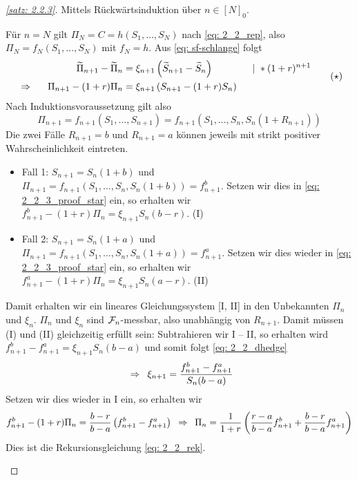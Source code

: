 \begin{proof}[\cref{satz: 2.2.3}]
	Mittels Rückwärtsinduktion über $n \in [N]_0$.
	\begin{induction}
		\ianfang Für $n = N$ gilt $\Pi_N = C = h(S_1, \dots, S_N)$ nach \eqref{eq: 2_2_rep}, also $\Pi_N = f_N(S_1, \dots, S_N)$ mit $f_N = h$.
		\ischritt Aus \eqref{eq: sf-schlange} folgt
		\begin{equation*}
			\begin{aligned}
				\widetilde{\Pi}_{n+1} - \widetilde{\Pi}_n &= \xi_{n+1} \left( \widetilde{S}_{n+1} - \widetilde{S}_n \right) \qquad\qquad | \ * (1+r)^{n+1} \\
				\enskip \Rightarrow \enskip  \quad \Pi_{n+1} - (1+r) \Pi_n &= \xi_{n+1} \left( S_{n+1} - (1+r) S_n \right)
			\end{aligned} \tag{$\star$} \label{eq: 2_2_3_proof_star}
		\end{equation*}
		Nach Induktionsvoraussetzung gilt also
		\begin{equation*}
			\Pi_{n+1} = f_{n+1} (S_1, \dots, S_{n+1}) = f_{n+1} (S_1, \dots, S_n, S_n (1+R_{n+1}))
		\end{equation*}
		Die zwei Fälle $R_{n+1} = b$ und $R_{n+1} = a$ können jeweils mit strikt positiver Wahrscheinlichkeit eintreten.
		\begin{itemize}
			\item Fall 1: $S_{n+1} = S_n (1+b)$ und $\Pi_{n+1} = f_{n+1}(S_1, \dots, S_n, S_n(1+b)) = f_{n+1}^b$. Setzen wir dies in \eqref{eq: 2_2_3_proof_star} ein, so erhalten wir $f_{n+1}^b - (1+r) \Pi_n = \xi_{n+1} S_n (b-r)$. \hfill (I)
			\item Fall 2: $S_{n+1} = S_n (1+a)$ und $\Pi_{n+1} = f_{n+1}(S_1, \dots, S_n, S_n(1+a)) = f_{n+1}^a$. Setzen wir dies wieder in \eqref{eq: 2_2_3_proof_star} ein, so erhalten wir $f_{n+1}^a - (1+r) \Pi_n = \xi_{n+1} S_n (a-r)$. \hfill (II)
		\end{itemize}
	Damit erhalten wir ein lineares Gleichungssystem [I, II] in den Unbekannten $\Pi_n$ und $\xi_n$. 
	$\Pi_n$ und $\xi_n$ sind $\mathcal{F}_n$-messbar, also unabhängig von $R_{n+1}$. Damit müssen (I) und (II) gleichzeitig erfüllt sein: Subtrahieren wir I -- II, so erhalten wird $f_{n+1}^b - f_{n+1}^a = \xi_{n+1} S_n (b-a)$ und somit folgt \eqref{eq: 2_2_dhedge}
	\begin{equation*}
		\enskip \Rightarrow \enskip \xi_{n+1} = \frac{f_{n+1}^b - f_{n+1}^a}{S_n (b-a)}
	\end{equation*}
	Setzen wir dies wieder in I ein, so erhalten wir
	\begin{equation*}
		f_{n+1}^b - (1+r) \Pi_n = \frac{b-r}{b-a} \left( f_{n+1}^b - f_{n+1}^a \right) \enskip \Rightarrow \enskip \Pi_n = \frac{1}{1+r} \left( \frac{r-a}{b-a} f_{n+1}^b + \frac{b-r}{b-a} f_{n+1}^a \right)
	\end{equation*}
	Dies ist die Rekursionsgleichung \eqref{eq: 2_2_rek}.
	\end{induction}
\end{proof}

